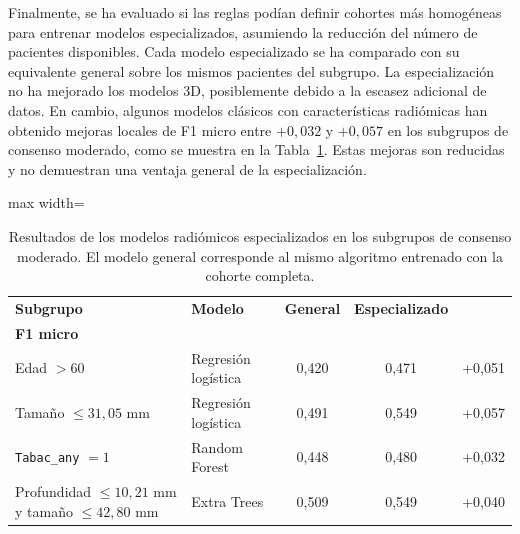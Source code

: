 
Finalmente, se ha evaluado si las reglas podían definir cohortes más homogéneas para entrenar modelos especializados, asumiendo la reducción del número de pacientes disponibles. Cada modelo especializado se ha comparado con su equivalente general sobre los mismos pacientes del subgrupo. La especialización no ha mejorado los modelos 3D, posiblemente debido a la escasez adicional de datos. En cambio, algunos modelos clásicos con características radiómicas han obtenido mejoras locales de F1 micro entre \(+0{,}032\) y \(+0{,}057\) en los subgrupos de consenso moderado, como se muestra en la Tabla~\ref{tab:resultados_modelos_subgrupos}. Estas mejoras son reducidas y no demuestran una ventaja general de la especialización.


\begin{table}[!htbp]
\centering
\small
\setlength{\tabcolsep}{4pt}

\caption{Resultados de los modelos radiómicos especializados en los subgrupos de consenso moderado. El modelo general corresponde al mismo algoritmo entrenado con la cohorte completa.}
\label{tab:resultados_modelos_subgrupos}

\begin{adjustbox}{max width=\textwidth}
\begin{tabular}{llccc}
\toprule
\textbf{Subgrupo} &
\textbf{Modelo} &
\textbf{General} &
\textbf{Especializado} &
\shortstack{\(\boldsymbol{\Delta}\)\\\textbf{F1 micro}} \\
\midrule

Edad \(>60\) &
Regresión logística &
0,420 &
0,471 &
+0,051 \\

Tamaño \(\leq 31{,}05\) mm &
Regresión logística &
0,491 &
0,549 &
+0,057 \\

\texttt{Tabac\_any} \(=1\) &
Random Forest &
0,448 &
0,480 &
+0,032 \\

Profundidad \(\leq 10{,}21\) mm y tamaño \(\leq 42{,}80\) mm &
Extra Trees &
0,509 &
0,549 &
+0,040 \\

\bottomrule
\end{tabular}
\end{adjustbox}
\end{table}


